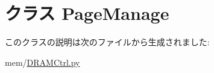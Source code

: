 \hypertarget{classDRAMCtrl_1_1PageManage}{
\section{クラス PageManage}
\label{classDRAMCtrl_1_1PageManage}
}


このクラスの説明は次のファイルから生成されました:\begin{DoxyCompactItemize}
\item 
mem/\hyperlink{DRAMCtrl_8py}{DRAMCtrl.py}\end{DoxyCompactItemize}
